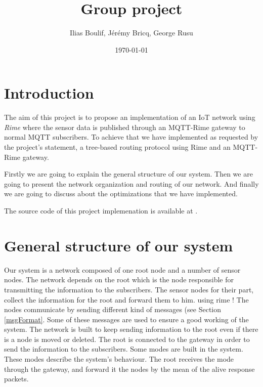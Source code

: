 \documentclass[a4paper,10pt]{article}
\title{Group project}
\author{Ilias Boulif, Jérémy Bricq, George Rusu}
\date{\today}
\begin{document}
\maketitle
\tableofcontents
\newpage
\section{Introduction}

The aim of this project is to propose an implementation of an IoT network using \textit{Rime} where the sensor data is published through an MQTT-Rime gateway to normal MQTT subscribers. To achieve that we have implemented as requested by the project's statement, a tree-based routing protocol using Rime and an MQTT-Rime gateway.

Firstly we are going to explain the general structure of our system. Then we are going to present the network organization and routing of our network. And finally we are going to discuss about the optimizations that we have implemented.

The source code of this project implemenation is available at \cite{github}.


\section{General structure of our system}

Our system is a network composed of one root node and a number of sensor nodes. The network depends on the root which is the node responsible for transmitting the information to the subscribers. The sensor nodes for their part, collect the information for the root and forward them to him.  using rime ! The nodes communicate by sending different kind of messages (see Section \ref{msgFormat}. Some of these messages are used to ensure a good working of the system. The network is built to keep sending information to the root even if there is a node is moved or deleted.  The root is connected to the gateway in order to send the information to the subscribers. Some modes are built in the system. These modes describe the system's behaviour. The root receives the mode through the gateway, and forward it the nodes by the mean of the alive response packets. 
\end{document}
